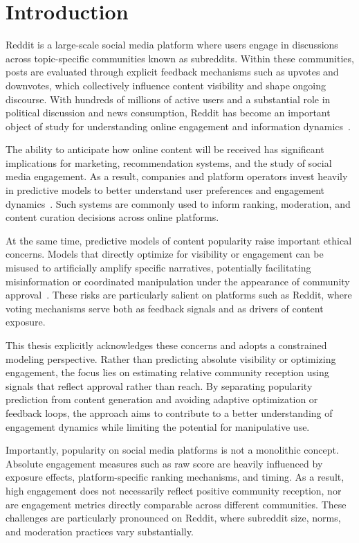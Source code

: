 \chapter{Introduction}

Reddit is a large-scale social media platform where users engage in discussions across topic-specific communities known as subreddits. Within these communities, posts are evaluated through explicit feedback mechanisms such as upvotes and downvotes, which collectively influence content visibility and shape ongoing discourse. With hundreds of millions of active users and a substantial role in political discussion and news consumption, Reddit has become an important object of study for understanding online engagement and information dynamics~\cite{redditinc,pewresearch}.

The ability to anticipate how online content will be received has significant implications for marketing, recommendation systems, and the study of social media engagement. As a result, companies and platform operators invest heavily in predictive models to better understand user preferences and engagement dynamics~\cite{deaton2017using}. Such systems are commonly used to inform ranking, moderation, and content curation decisions across online platforms.

At the same time, predictive models of content popularity raise important ethical concerns. Models that directly optimize for visibility or engagement can be misused to artificially amplify specific narratives, potentially facilitating misinformation or coordinated manipulation under the appearance of community approval~\cite{deaton2017using}. These risks are particularly salient on platforms such as Reddit, where voting mechanisms serve both as feedback signals and as drivers of content exposure.

This thesis explicitly acknowledges these concerns and adopts a constrained modeling perspective. Rather than predicting absolute visibility or optimizing engagement, the focus lies on estimating relative community reception using signals that reflect approval rather than reach. By separating popularity prediction from content generation and avoiding adaptive optimization or feedback loops, the approach aims to contribute to a better understanding of engagement dynamics while limiting the potential for manipulative use.

Importantly, popularity on social media platforms is not a monolithic concept. Absolute engagement measures such as raw score are heavily influenced by exposure effects, platform-specific ranking mechanisms, and timing. As a result, high engagement does not necessarily reflect positive community reception, nor are engagement metrics directly comparable across different communities. These challenges are particularly pronounced on Reddit, where subreddit size, norms, and moderation practices vary substantially.

